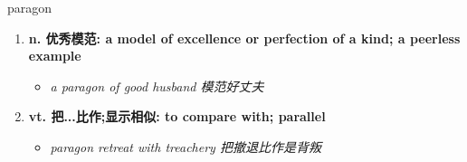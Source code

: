
\begin{frame}
{\huge paragon}
\begin{center}
\begin{enumerate}\Large
  \item \textbf{n. 优秀模范: a model of excellence or perfection of a kind; a peerless example}
  \begin{itemize}
    \item \em{\Large{a paragon of good husband 模范好丈夫}}
  \end{itemize}
  \item \textbf{vt. 把...比作;显示相似: to compare with; parallel}
  \begin{itemize}
    \item \em{\Large{paragon retreat with treachery 把撤退比作是背叛}}
  \end{itemize}
\end{enumerate}
\end{center}
\end{frame}
